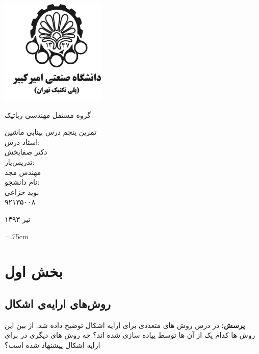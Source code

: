 \documentclass[12pt,a4paper]{article}
\theoremstyle{definition}
\theoremstyle{theorem}
\theoremstyle{definition}
\begin{document}
\thispagestyle{empty}
\vspace*{-28mm}
\centerline{\includegraphics[height=5cm]{logo.png}}
\begin{center}
\vspace{-2mm}
{\large \titr
گروه مستقل مهندسی رباتیک
\\[2.1cm]
}

{\Large \titr
تمرین پنجم درس بینایی ماشین
\\[2cm]
استاد درس:
\\[.5cm]
دکتر صفابخش
\\[1.5cm]
\large 
تدریس‌یار: 
\\[0.5cm]
مهندس مجد
\\[1.5cm]
نام دانشجو:
\\[.5cm]
نوید خزاعی
\\[.5cm]
۹۲۱۳۵۰۰۸
\\[1.5cm]
}
\baselineskip=1cm

{\large
تیر ۱۳۹۳
}
\end{center}
\newpage
{}
\baselineskip=1cm
\tableofcontents

\baselineskip=.75cm
\newpage 
{}
\section{بخش اول}
\subsection{روش‌های ارایه‌ی اشکال}


\textbf{پرسش:}
 در درس روش های متعددی برای ارایه اشکال توضیح داده شد. از بین این روش ها کدام یک از آن ها توسط  پیاده سازی شده اند؟ چه روش های دیگری در  برای ارایه اشکال پیشنهاد شده است؟
 
\end{document}
